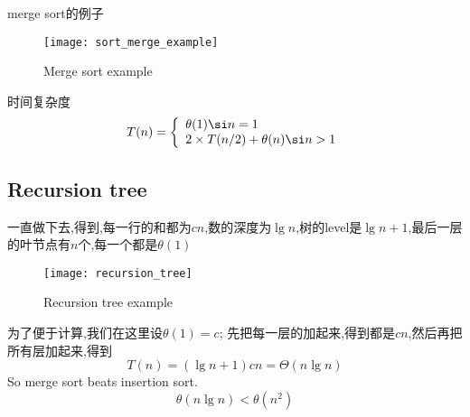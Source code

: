\documentclass{article}
\begin{document}
merge sort的例子
\begin{figure}[htbp]
  \centering
  \texttt{[image: sort\_merge\_example]}\\
  \caption{Merge sort example}\label{fig.sort.merge.example}
\end{figure}

时间复杂度
$$
T(n) =
\left\{
  \begin{array}{ll}
	\theta(1) \si n=1 \\
	2 \times T(n/2) + \theta(n) \si n>1
  \end{array}
\right.
$$

\subsection{Recursion tree}
一直做下去,得到,每一行的和都为$cn$,数的深度为$\lg n$,树的level是$\lg n+1$,最后一层的叶节点有$n$个,每一个都是$\theta(1)$

\begin{figure}[htbp]
  \centering
  \texttt{[image: recursion\_tree]}\\
  \caption{Recursion tree example}\label{fig.compute.recursion_tree}
\end{figure}

为了便于计算,我们在这里设$\theta(1)=c$;
先把每一层的加起来,得到都是$cn$,然后再把所有层加起来,得到
$$T(n)=(\lg n +1)cn=\Theta(n\lg n )$$
So merge sort beats insertion sort.
$$ \theta(n\lg n )<\theta(n^2) $$
\end{document}

